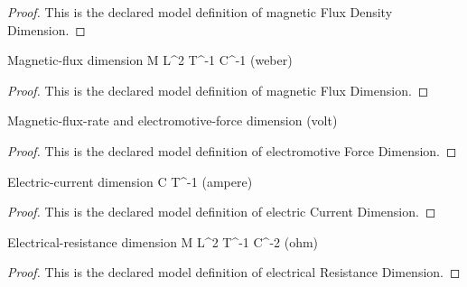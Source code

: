 \begin{proof}
  This is the declared model definition of magnetic Flux Density Dimension.
\end{proof}
\begin{definition}
  \label{def:physics:phyx-mini-0983:phyxminiproblems-problemphyxmini0983-magneticfluxdimension}
  Magnetic-flux dimension M L\textasciicircum{}2 T\textasciicircum{}-1 C\textasciicircum{}-1 (weber)
\end{definition}
\begin{proof}
  This is the declared model definition of magnetic Flux Dimension.
\end{proof}
\begin{definition}
  \label{def:physics:phyx-mini-0983:phyxminiproblems-problemphyxmini0983-electromotiveforcedimension}
  Magnetic-flux-rate and electromotive-force dimension (volt)
\end{definition}
\begin{proof}
  This is the declared model definition of electromotive Force Dimension.
\end{proof}
\begin{definition}
  \label{def:physics:phyx-mini-0983:phyxminiproblems-problemphyxmini0983-electriccurrentdimension}
  Electric-current dimension C T\textasciicircum{}-1 (ampere)
\end{definition}
\begin{proof}
  This is the declared model definition of electric Current Dimension.
\end{proof}
\begin{definition}
  \label{def:physics:phyx-mini-0983:phyxminiproblems-problemphyxmini0983-electricalresistancedimension}
  Electrical-resistance dimension M L\textasciicircum{}2 T\textasciicircum{}-1 C\textasciicircum{}-2 (ohm)
\end{definition}
\begin{proof}
  This is the declared model definition of electrical Resistance Dimension.
\end{proof}
